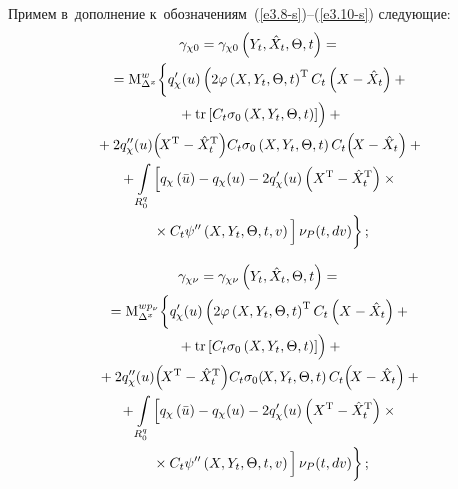 \begin{multicols}{2}
Примем в~дополнение к~обозначениям~(\ref{e3.8-s})--(\ref{e3.10-s}) следующие:
\begin{multline*}
    \gamma_{\chi 0}=
    \gamma_{\chi 0} \left(Y_t,\hat X_t,\Theta, t\right) ={}\\
    {}=
    \mm_{\Delta^x}^{w} \biggl\{ q_\chi^\prime(u) \left(2\varphi 
    \left(X,Y_t,\Theta,t\right)^{\mathrm{T}} C_t\left(X-\hat X_t\right)+{}\right.\\
    \left.{}+\mathrm{tr} 
    \left[ C_t\sigma_0
    \left(X,Y_t,\Theta,t\right)\right] 
    \vphantom{\left(X,Y_t,\Theta,t\right)^{\mathrm{T}}}\!\right)+{}\\
{}+ 2q_\chi^{\prime\prime}(u)\!\left(\!X^{\mathrm{T}}-\hat X_t^{\mathrm{T}}\right)\! 
C_t\sigma_0 \left(X,Y_t,\Theta,t\right)  C_t\!\left(\!X-\hat X_t\right)+{}\\
{}+\iii_{R_0^q} \left[ q_\chi \left(\bar u\right) -q_\chi (u) - 2
    q_\chi^\prime(u) \left(X^{\mathrm{T}}-\hat X_t^{\mathrm{T}}\right) \times{}\right.\\
    \left.{}\times
    C_t\psi'' \left(X,Y_t,\Theta,t,v\right)
    \vphantom{\left(X^{\mathrm{T}}-\hat X_t^{\mathrm{T}}\right)}
    \right] \nu_P (t,dv)\biggr\} \,;
    \end{multline*}
    
\vspace*{-12pt}

    \noindent
    \begin{multline*}
        \gamma_{\chi \nu}=
    \gamma_{\chi \nu} \left(Y_t,\hat X_t,\Theta,t\right) ={}\\
    {}=\mm_{\Delta^x}^{w p_\nu} \biggl\{
    q_\chi'(u) \left(2\varphi \left(X,Y_t,\Theta,t\right)^{\mathrm{T}} 
    C_t\left(X-\hat X_t\right)+ {}\right.\\
\left.    {}+\mathrm{tr} \left[
    C_t\sigma_0 \left(X,Y_t,\Theta,t\right)\right] 
    \vphantom{\left(X-\hat X_t\right)}
    \!\right)+{}\\
{}+ 2q_\chi'' (u)\!\left(\!X^{\mathrm{T}}-\hat X_t^{\mathrm{T}}\right)\! C_t\sigma_0
\!    \left(\!X,Y_t,\Theta,t\right) C_t\!\left(\!X-\hat X_t\right)+{}\\
{}+\iii_{R_0^q} \left[ q_\chi \left(\bar u\right) -q_\chi(u) - 
2 q_\chi ' (u) \left(X^{\mathrm{T}}-\hat X_t^{\mathrm{T}}\right) \times{}\right.\\
\left.{}\times
C_t \psi'' \left(X,Y_t,\Theta,t,v\right)
    \vphantom{\left(X^{\mathrm{T}}-\hat X_t^{\mathrm{T}}\right)}
    \right] \nu_P (t,dv)\biggr\} \,;
\end{multline*}


\end{multicols}
